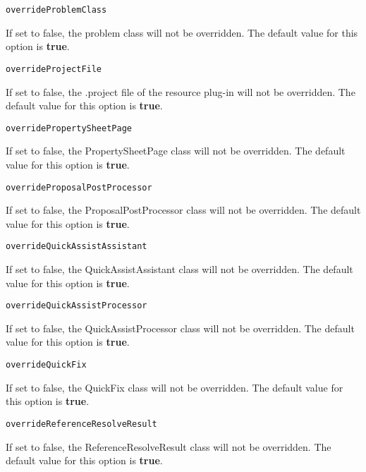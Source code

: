 \noindent\texttt{overrideProblemClass}
\begin{myindentpar}{1cm}
If set to false, the problem class will not be overridden. The default value for this option is \textbf{true}.
\end{myindentpar}

\noindent\texttt{overrideProjectFile}
\begin{myindentpar}{1cm}
If set to false, the .project file of the resource plug-in will not be overridden. The default value for this option is \textbf{true}.
\end{myindentpar}

\noindent\texttt{overridePropertySheetPage}
\begin{myindentpar}{1cm}
If set to false, the PropertySheetPage class will not be overridden. The default value for this option is \textbf{true}.
\end{myindentpar}

\noindent\texttt{overrideProposalPostProcessor}
\begin{myindentpar}{1cm}
If set to false, the ProposalPostProcessor class will not be overridden. The default value for this option is \textbf{true}.
\end{myindentpar}

\noindent\texttt{overrideQuickAssistAssistant}
\begin{myindentpar}{1cm}
If set to false, the QuickAssistAssistant class will not be overridden. The default value for this option is \textbf{true}.
\end{myindentpar}

\noindent\texttt{overrideQuickAssistProcessor}
\begin{myindentpar}{1cm}
If set to false, the QuickAssistProcessor class will not be overridden. The default value for this option is \textbf{true}.
\end{myindentpar}

\noindent\texttt{overrideQuickFix}
\begin{myindentpar}{1cm}
If set to false, the QuickFix class will not be overridden. The default value for this option is \textbf{true}.
\end{myindentpar}

\noindent\texttt{overrideReferenceResolveResult}
\begin{myindentpar}{1cm}
If set to false, the ReferenceResolveResult class will not be overridden. The default value for this option is \textbf{true}.
\end{myindentpar}

